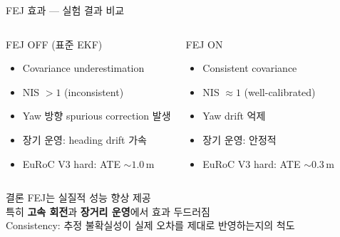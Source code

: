 \begin{frame}[shrink=10]{FEJ 효과 --- 실험 결과 비교}
  \begin{columns}[T]
      \begin{alertblock}{FEJ OFF (표준 EKF)}
        \begin{itemize}
          \item Covariance underestimation
          \item NIS $> 1$ (inconsistent)
          \item Yaw 방향 spurious correction 발생
          \item 장기 운영: heading drift 가속
          \item EuRoC V3 hard: ATE $\sim 1.0$\,m
        \end{itemize}
      \end{alertblock}
      \begin{exampleblock}{FEJ ON}
        \begin{itemize}
          \item Consistent covariance
          \item NIS $\approx 1$ (well-calibrated)
          \item Yaw drift 억제
          \item 장기 운영: 안정적
          \item EuRoC V3 hard: ATE $\sim 0.3$\,m
        \end{itemize}
      \end{exampleblock}
  \end{columns}
  \vspace{0.4em}
  \begin{block}{결론}
    FEJ는 실질적 성능 향상 제공\\
    특히 \textbf{고속 회전}과 \textbf{장거리 운영}에서 효과 두드러짐\\
    Consistency: 추정 불확실성이 실제 오차를 제대로 반영하는지의 척도
  \end{block}
\end{frame}


